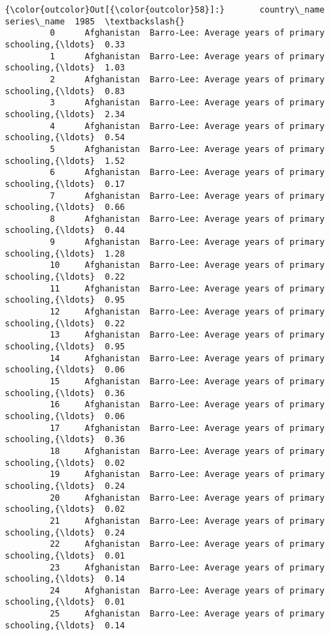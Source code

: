 \documentclass[11pt]{article}
\begin{document}
\begin{Verbatim}[commandchars=\\\{\}]
{\color{outcolor}Out[{\color{outcolor}58}]:}       country\_name                                        series\_name  1985  \textbackslash{}
         0      Afghanistan  Barro-Lee: Average years of primary schooling,{\ldots}  0.33   
         1      Afghanistan  Barro-Lee: Average years of primary schooling,{\ldots}  1.03   
         2      Afghanistan  Barro-Lee: Average years of primary schooling,{\ldots}  0.83   
         3      Afghanistan  Barro-Lee: Average years of primary schooling,{\ldots}  2.34   
         4      Afghanistan  Barro-Lee: Average years of primary schooling,{\ldots}  0.54   
         5      Afghanistan  Barro-Lee: Average years of primary schooling,{\ldots}  1.52   
         6      Afghanistan  Barro-Lee: Average years of primary schooling,{\ldots}  0.17   
         7      Afghanistan  Barro-Lee: Average years of primary schooling,{\ldots}  0.66   
         8      Afghanistan  Barro-Lee: Average years of primary schooling,{\ldots}  0.44   
         9      Afghanistan  Barro-Lee: Average years of primary schooling,{\ldots}  1.28   
         10     Afghanistan  Barro-Lee: Average years of primary schooling,{\ldots}  0.22   
         11     Afghanistan  Barro-Lee: Average years of primary schooling,{\ldots}  0.95   
         12     Afghanistan  Barro-Lee: Average years of primary schooling,{\ldots}  0.22   
         13     Afghanistan  Barro-Lee: Average years of primary schooling,{\ldots}  0.95   
         14     Afghanistan  Barro-Lee: Average years of primary schooling,{\ldots}  0.06   
         15     Afghanistan  Barro-Lee: Average years of primary schooling,{\ldots}  0.36   
         16     Afghanistan  Barro-Lee: Average years of primary schooling,{\ldots}  0.06   
         17     Afghanistan  Barro-Lee: Average years of primary schooling,{\ldots}  0.36   
         18     Afghanistan  Barro-Lee: Average years of primary schooling,{\ldots}  0.02   
         19     Afghanistan  Barro-Lee: Average years of primary schooling,{\ldots}  0.24   
         20     Afghanistan  Barro-Lee: Average years of primary schooling,{\ldots}  0.02   
         21     Afghanistan  Barro-Lee: Average years of primary schooling,{\ldots}  0.24   
         22     Afghanistan  Barro-Lee: Average years of primary schooling,{\ldots}  0.01   
         23     Afghanistan  Barro-Lee: Average years of primary schooling,{\ldots}  0.14   
         24     Afghanistan  Barro-Lee: Average years of primary schooling,{\ldots}  0.01   
         25     Afghanistan  Barro-Lee: Average years of primary schooling,{\ldots}  0.14   

\end{Verbatim}
\end{document}
